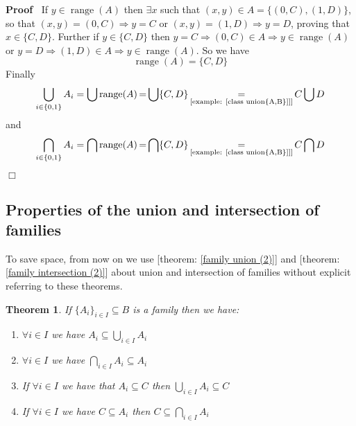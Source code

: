 \documentclass{book}
\newcommand{\equallim}{\mathop{=}\limits}
\newcommand{\tmop}[1]{\ensuremath{\operatorname{#1}}}
\newenvironment{proof}{\noindent\textbf{Proof\ }}{\hspace*{\fill}$\Box$\medskip}
\newtheorem{theorem}{Theorem}
\begin{document}
\begin{proof}
  If $y \in \tmop{range} (A)$ then $\exists x$ such that $(x, y) \in A = \{
  (0, C), (1, D) \}$, so that $(x, y) = (0, C) \Rightarrow y = C$ or $(x, y) =
  (1, D) \Rightarrow y = D$, proving that $x \in \{ C, D \}$. Further if $y
  \in \{ C, D \}$ then $y = C \Rightarrow (0, C) \in A \Rightarrow y \in
  \tmop{range} (A)$ or $y = D \Rightarrow (1, D) \in A \Rightarrow y \in
  \tmop{range} (A)$. So we have
  \[ \tmop{range} (A) = \{ C, D \} \]
  Finally
  \[ \bigcup_{i \in \{ 0, 1 \}} A_i = \bigcup \tmop{range} (A) \equallim
     \bigcup \{ C, D \} \equallim_{\text{[example: \ref{class union{A,B}}]]}}
     C \bigcup D \]
  and
  \[ \bigcap_{i \in \{ 0, 1 \}} A_i = \bigcap \tmop{range} (A) \equallim
     \bigcap \{ C, D \} \equallim_{\text{[example: \ref{class union{A,B}}]]}}
     C \bigcap D \]
  
\end{proof}

\subsection{Properties of the union and intersection of families}

To save space, from now on we use [theorem: \ref{family union (2)}] and
[theorem: \ref{family intersection (2)}] about union and intersection of
families without explicit referring to these theorems.

\begin{theorem}
  \label{family properties (1)}If $\{ A_i \}_{i \in I} \subseteq B$ is a
  family then we have:
  \begin{enumerate}
    \item $\forall i \in I$ we have $A_i \subseteq \bigcup_{i \in I} A_i$
    
    \item $\forall i \in I$ we have $\bigcap_{i \in I} A_i \subseteq A_i$
    
    \item If $\forall i \in I$ we have that $A_i \subseteq C$ then $\bigcup_{i
    \in I} A_i \subseteq C$
    
    \item If $\forall i \in I$ we have $C \subseteq A_i$ then $C \subseteq
    \bigcap_{i \in I} A_i$
  \end{enumerate}
\end{theorem}
\end{document}

